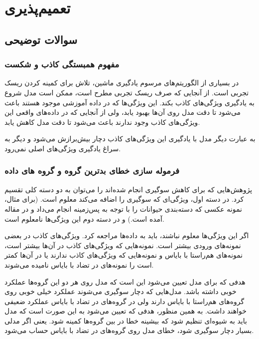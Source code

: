 
\def \Subject {تعمیم‌پذیری}
\def \Session { یک}
\renewcommand{\chaptername}{سوال}
\chapter{\Subject}
\section{سوالات توضیحی}
\subsection{مفهوم همبستگی کاذب و شکست }
در بسیاری از  الگوریتم‌های مرسوم یادگیری ماشین،‌ تلاش برای کمینه کردن 
ریسک تجربی 
است.  از آنجایی که صرف ریسک تجربی مطرح است، ممکن است مدل شروع به یادگیری ویژگی‌های کاذب بکند. این ویژگی‌ها که در داده آموزشی موجود هستند باعث می‌شود تا دقت مدل روی آن‌ها بهبود یابد، ولی از آنجایی که در داده‌های واقعی این ویژگی‌های کاذب وجود ندارند باعث می‌شود تا دقت مدل کاهش یابد.

به عبارت دیگر مدل با یادگیری این ویژگی‌های کاذب دچار بیش‌برازش می‌شود و دیگر به سراغ یادگیری ویژگی‌های اصلی نمی‌رود. 

\subsection{ فرموله سازی خطای بدترین گروه و گروه های داده }

پژوهش‌هایی که برای کاهش سوگیری انجام شده‌اند را می‌توان به دو دسته کلی تقسیم کرد. در دسته اول، ویژگی‌ای که سوگیری را اضافه می‌کند معلوم است. (برای مثال، نمونه عکسی که دسته‌بندی حیوانات را با توجه به پس‌زمینه انجام می‌داد و در مقاله آمده است.) و در دسته دوم این ویژگی‌ها نامعلوم است.

اگر این ويژگی‌ها معلوم نباشند، باید به داده‌ها مراجعه کرد. ویژگی‌های کاذب در بعضی نمونه‌های ورودی بیشتر است. نمونه‌هایی که ویژگی‌های کاذب در آن‌ها بیشتر است، نمونه‌های هم‌راستا با بایاس
و نمونه‌هایی که ویژگی‌های کاذب ندارند یا در آن‌ها کمتر است را نمونه‌های در تضاد 
با بایاس
نامیده می‌شوند. 

هدفی که برای مدل تعیین می‌شود این است که مدل روی هر دو این گروه‌ها عملکرد خوبی داشته باشد. مدل‌هایی که دچار سوگیری می‌شوند عملکرد خیلی خوبی روی گروه‌های هم‌راستا با بایاس دارند ولی در گروه‌های در تضاد با بایاس عملکرد ضعیفی خواهند داشت. به همین منظور، هدفی که تعیین می‌شود به این صورت است که مدل باید به شیوه‌ای تنظیم شود که بیشینه خطا در بین گروه‌ها کمینه شود. یعنی اگر مدلی بسیار دچار سوگیری شود، خطای مدل روی گروه‌های در تضاد با بایاس حساب می‌شود.

